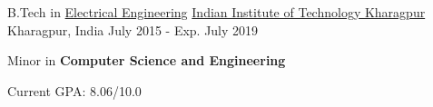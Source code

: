 

\begin{cventries}

  \cventry
    {B.Tech in \href{http://www.ee.iitkgp.ac.in/}{Electrical Engineering}} %
    {\href{http://www.iitkgp.ac.in/}{Indian Institute of Technology Kharagpur}} %
    {Kharagpur, India} %
    {July 2015 - Exp. July 2019} %
    {
      \begin{cvitems} %
        \item {Minor in \color{gray}\textbf{Computer Science and Engineering}}
        \item {Current GPA: 8.06/10.0}
      \end{cvitems}
    }

\end{cventries}
